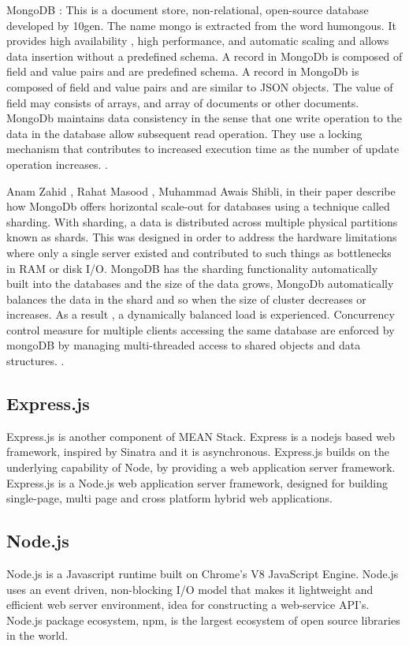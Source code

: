		MongoDB : This is a document store, non-relational, open-source database developed by 10gen. The name mongo is extracted from the word humongous. It provides high availability , high performance, and automatic scaling and allows data insertion without a predefined schema. A record in MongoDb is composed of field and value pairs and are predefined schema. A record in MongoDb is composed of field and value pairs and are similar to JSON objects. The value of field may consists of arrays, and array of documents or other documents. MongoDb maintains data consistency in the sense that one write operation to the data in the database allow subsequent read operation. They use a locking mechanism that contributes to increased execution time as the number of update operation increases. \cite{MongoOfficial} \cite{EricRedmond}.
		
		
		Anam Zahid , Rahat Masood , Muhammad Awais Shibli, in their paper describe how MongoDb  offers horizontal scale-out  for databases using a technique called sharding. With sharding, a data is distributed across multiple physical partitions known as shards. This was designed in order to address the hardware limitations where only a single server existed and contributed to such things as bottlenecks in RAM or disk I/O. MongoDB has the sharding functionality automatically built into the databases and the size of the data grows, MongoDb automatically balances the data in the shard and so when the size of cluster decreases or increases. As a result , a dynamically balanced load is experienced. Concurrency control measure for multiple clients accessing the same database are enforced by mongoDB by managing multi-threaded access to shared objects and data structures. \cite{MongoOfficial} \cite{MongoDbArchitectureGuide}.
		
		
		
		\subsection{Express.js}
		\cite{expressRef}Express.js is another component of MEAN Stack. Express is a nodejs based web framework, inspired by Sinatra and it is asynchronous. Express.js builds on the underlying capability of Node, by providing a web application server framework. Express.js is a Node.js web application server framework, designed for building single-page, multi page and cross platform hybrid web applications\cite{expressRefWiki}. 
		
		\subsection{Node.js}
		Node.js is a Javascript runtime built on Chrome’s V8 JavaScript Engine. Node.js uses an event driven, non-blocking I/O model that makes it lightweight and efficient web server environment, idea for constructing a web-service API’s\cite{Node.jsWiki}. Node.js package ecosystem, npm, is the largest ecosystem of open source libraries in the world. \cite{expressRefWiki} 
		
